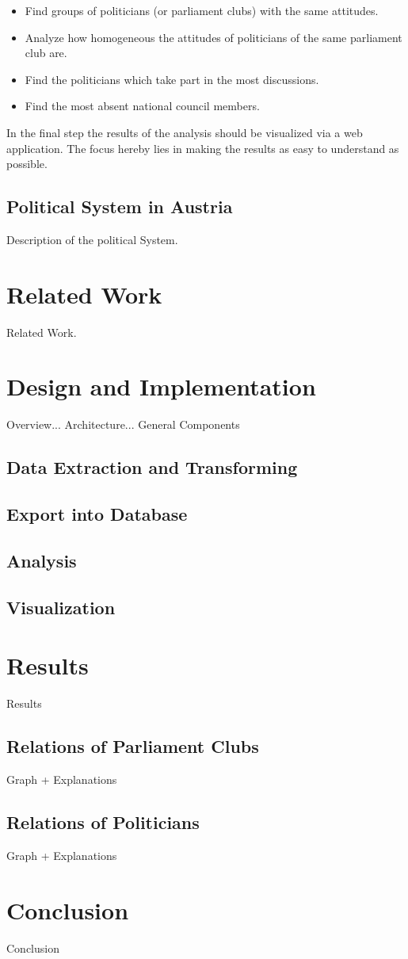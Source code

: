 \documentclass[12pt]{report}
\begin{document}
\begin{itemize}
  \item Find groups of politicians (or parliament clubs) with the same attitudes.
  \item Analyze how homogeneous the attitudes of politicians of the same parliament club are.
  \item Find the politicians which take part in the most discussions.
  \item Find the most absent national council members.
\end{itemize}

In the final step the results of the analysis should be visualized via a web application. The focus hereby lies in making the results as easy to understand as possible.

\section{Political System in Austria}
Description of the political System.

\chapter{Related Work}
Related Work.

\chapter{Design and Implementation}

Overview... Architecture... General Components

\section{Data Extraction and Transforming}

\section{Export into Database}

\section{Analysis}

\section{Visualization}

\chapter{Results}
Results

\section{Relations of Parliament Clubs}
Graph + Explanations

\section{Relations of Politicians}
Graph + Explanations

\chapter{Conclusion}
Conclusion

 

\end{document}
